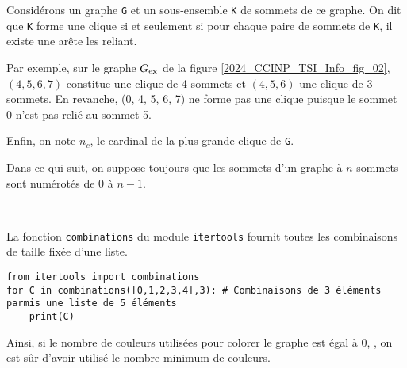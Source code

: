 \ifprof \else

Considérons un graphe \lstinline{G} et un sous-ensemble \lstinline{K} de sommets de ce graphe. On dit que \lstinline{K} forme une clique si et seulement si pour chaque paire de sommets de \lstinline{K}, il existe une arête les reliant.

Par exemple, sur le graphe ${G}_{\text{ex}}$ de la figure \ref{2024_CCINP_TSI_Info_fig_02}, $(4, 5, 6, 7)$ constitue une clique de 4 sommets et $(4, 5, 6)$ une clique de 3 sommets. En revanche, (0, 4, 5, 6, 7) ne forme pas une clique puisque le sommet 0 n'est pas relié au sommet 5.

Enfin, on note $n_c$, le cardinal de la plus grande clique de \lstinline{G}.
\fi


\ifprof
\begin{corrige}

\end{corrige}
\else
\fi

Dans ce qui suit, on suppose toujours que les sommets d'un graphe à $n$ sommets sont numérotés de 0 à $n-1$.

\ifprof
\begin{corrige}~\\ \vspace{-.5cm}

\end{corrige}
\else
\fi

\ifprof \else
La fonction \lstinline{combinations} du module \lstinline{itertools}%
fournit toutes les combinaisons de taille fixée d'une liste. 
\begin{lstlisting}
from itertools import combinations
for C in combinations([0,1,2,3,4],3): # Combinaisons de 3 éléments parmis une liste de 5 éléments
    print(C)
\end{lstlisting}
\fi

\ifprof
\begin{corrige}

\end{corrige}
\else
\fi

\ifprof \else
Ainsi, si le nombre de couleurs utilisées pour colorer le graphe est égal à 0, , on est sûr d'avoir utilisé le nombre minimum de couleurs.
\fi